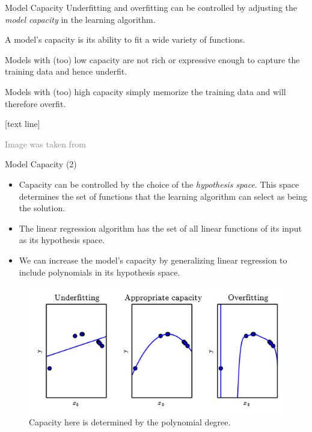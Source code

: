 \documentclass[dvipsnames]{beamer}
\newcommand{\referencefootnote}[1]{\setbeamertemplate{footline}[text line]{%
\parbox{0.9\paperwidth}{\vspace*{-23pt}\tiny{\textcolor{gray}{#1}}\hfill\scriptsize\insertframenumber}}}
\begin{document}
\begin{frame}{Model Capacity}
Underfitting and overfitting can be controlled by adjusting the \emph{model capacity} in the learning algorithm.  \pause

A model's capacity is its ability to fit a wide variety of functions. \pause

Models with (too) low capacity are not rich or expressive enough to capture the training data and hence underfit.  \pause

Models with (too) high capacity simply memorize the training data and will therefore overfit. 
\end{frame}
{ \referencefootnote{Image was taken from \cite{Goodfellow_et_al_2016}}
\begin{frame}{Model Capacity (2)}
\begin{itemize}
	\item Capacity can be controlled by the choice of the \emph{hypothesis space}. This space determines the set of functions that the learning algorithm can select as being the solution.  \pause
	\item The linear regression algorithm has the set of all linear functions of its input as its hypothesis space. \pause
	\item We can increase the model's capacity by generalizing linear regression to include polynomials in its hypothesis space. 
\end{itemize}
 \begin{figure}
		\center
		\includegraphics[scale=.35]{figures/capacity2.png} 
		\caption{Capacity here is determined by the polynomial degree.}
	\end{figure}
\end{frame}
}
\end{document}
